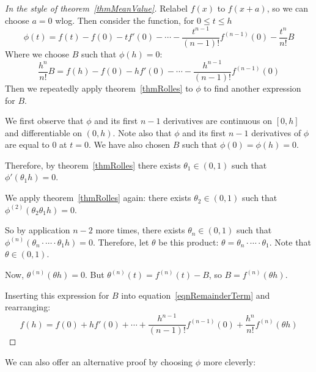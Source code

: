 \documentclass[../Main.tex]{subfiles}
\begin{document}
\begin{proof}[In the style of theorem~\ref{thmMeanValue}]
    Relabel $f(x)$ to $f(x + a)$, so we can choose $a = 0$ wlog. Then consider the function, for $0 \leq t \leq h$
    \begin{equation*}
        \phi(t) = f(t) - f(0) - tf'(0) - \cdots - \frac{t^{n-1}}{(n-1)!} f^{(n-1)}(0) - \frac{t^n}{n!}B
    \end{equation*}
    Where we choose $B$ such that $\phi(h) = 0$:
    \begin{equation}
        \frac{h^n}{n!} B = f(h) - f(0) - hf'(0) - \cdots - \frac{h^{n-1}}{(n-1)!} f^{(n-1)}(0)
        \label{eqnRemainderTerm}
    \end{equation}
    Then we repeatedly apply theorem~\ref{thmRolles} to $\phi$ to find another expression for $B$.\par
    We first observe that $\phi$ and its first $n - 1$ derivatives are continuous on $[0, h]$ and differentiable on $(0, h)$. Note also that $\phi$ and its first $n - 1$ derivatives of $\phi$ are equal to $0$ at $t = 0$. We have also chosen $B$ such that $\phi(0) = \phi(h) = 0$.\par
    Therefore, by theorem~\ref{thmRolles} there exists $\theta_1 \in (0, 1)$ such that $\phi'(\theta_1h) = 0$.\par
    We apply theorem~\ref{thmRolles} again: there exists $\theta_2 \in (0, 1)$ such that $\phi^{(2)}(\theta_2\theta_1h) = 0$.\par
    So by application $n-2$ more times, there exists $\theta_n \in (0, 1)$ such that $\phi^{(n)}(\theta_n \cdot \cdots \cdot \theta_1h) = 0$. Therefore, let $\theta$ be this product: $\theta = \theta_n \cdot \cdots \cdot \theta_1$. Note that $\theta \in (0, 1)$.\par
    Now, $\theta^{(n)}(\theta h) = 0$. But $\theta^{(n)}(t) = f^{(n)}(t) - B$, so $B = f^{(n)}(\theta h)$.\par
    Inserting this expression for $B$ into equation~\ref{eqnRemainderTerm} and rearranging:
    \begin{equation*}
        f(h) = f(0) + hf'(0) + \cdots + \frac{h^{n-1}}{(n-1)!}f^{(n-1)}(0) + \frac{h^n}{n!} f^{(n)}(\theta h)
    \end{equation*}
\end{proof}
We can also offer an alternative proof by choosing $\phi$ more cleverly:
\end{document}
